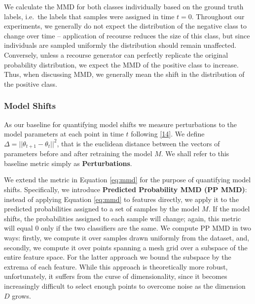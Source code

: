 \documentclass[conference,final,]{IEEEtran}
\theoremstyle{definition}
\theoremstyle{definition}
\theoremstyle{definition}
\theoremstyle{definition}
\theoremstyle{remark}
\begin{document}
We calculate the MMD for both classes individually based on the ground truth labels, i.e.~the labels that samples were assigned in time \(t=0\). Throughout our experiments, we generally do not expect the distribution of the negative class to change over time -- application of recourse reduces the size of this class, but since individuals are sampled uniformly the distribution should remain unaffected. Conversely, unless a recourse generator can perfectly replicate the original probability distribution, we expect the MMD of the positive class to increase. Thus, when discussing MMD, we generally mean the shift in the distribution of the positive class.

\hypertarget{model-shifts}{%
\subsubsection{Model Shifts}\label{model-shifts}}

As our baseline for quantifying model shifts we measure perturbations to the model parameters at each point in time \(t\) following \protect\hyperlink{ref-upadhyay2021robust}{{[}14{]}}. We define \(\Delta=||\theta_{t+1}-\theta_{t}||^2\), that is the euclidean distance between the vectors of parameters before and after retraining the model \(M\). We shall refer to this baseline metric simply as \textbf{Perturbations}.

We extend the metric in Equation \eqref{eq:mmd} for the purpose of quantifying model shifts. Specifically, we introduce \textbf{Predicted Probability MMD (PP MMD)}: instead of applying Equation \eqref{eq:mmd} to features directly, we apply it to the predicted probabilities assigned to a set of samples by the model \(M\). If the model shifts, the probabilities assigned to each sample will change; again, this metric will equal 0 only if the two classifiers are the same. We compute PP MMD in two ways: firstly, we compute it over samples drawn uniformly from the dataset, and, secondly, we compute it over points spanning a mesh grid over a subspace of the entire feature space. For the latter approach we bound the subspace by the extrema of each feature. While this approach is theoretically more robust, unfortunately, it suffers from the curse of dimensionality, since it becomes increasingly difficult to select enough points to overcome noise as the dimension \(D\) grows.
\end{document}
